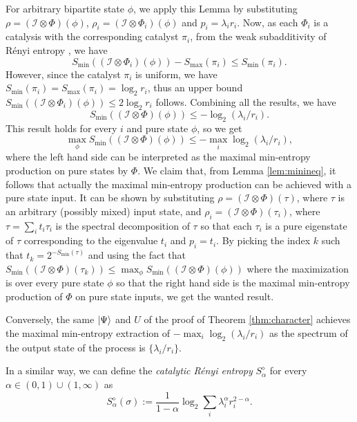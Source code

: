 \documentclass[aps, reprint, amsmath,amssymb, prx, superscriptaddress]{revtex4-2}
\begin{document}
\begin{proofEnd}
    For arbitrary bipartite state $\phi$, we apply this Lemma by substituting $\rho=(\mathcal{I}\otimes \Phi)(\phi)$, $\rho_i=(\mathcal{I}\otimes \Phi_i)(\phi)$ and $p_i = \lambda_i r_i$. Now, as each $\Phi_i$ is a catalysis with the corresponding catalyst $\pi_i$, from the weak subadditivity of R\'{e}nyi entropy \cite{van2002renyi}, we have
    $$S_{\min{}}((\mathcal{I}\otimes \Phi_i)(\phi))-S_{\max{}}(\pi_i)\leq S_{\min{}}(\pi_i).$$
    However, since the catalyst $\pi_i$ is uniform, we have $S_{\min{}}(\pi_i)=S_{\max{}}(\pi_i)=\log_2  r_i$, thus an upper bound $S_{\min{}}((\mathcal{I}\otimes \Phi_i)(\phi)) \leq 2 \log_2  r_i$ follows. Combining all the results, we have
    $$S_{\min{}}((\mathcal{I}\otimes \Phi)(\phi)) \leq  - \log_2  (\lambda_i/r_i).$$
    This result holds for every $i$ and pure state $\phi$, so we get
    \begin{equation}
        \max_\phi S_{\min{}}((\mathcal{I}\otimes \Phi)(\phi)) \leq  - \max_i \log_2  (\lambda_i/r_i),
    \end{equation}
    where the left hand side can be interpreted as the maximal min-entropy production on pure states by $\Phi$. We claim that, from Lemma \ref{lem:minineq}, it follows that actually the maximal min-entropy production can be achieved with a pure state input. It can be shown by substituting $\rho=(\mathcal{I}\otimes\Phi)(\tau)$, where $\tau$ is an arbitrary (possibly mixed) input state, and $\rho_i=(\mathcal{I}\otimes\Phi)(\tau_i)$, where $\tau=\sum_i t_i \tau_i$ is the spectral decomposition of $\tau$ so that each $\tau_i$ is a pure eigenstate of $\tau$ corresponding to the eigenvalue $t_i$ and $p_i=t_i$. By picking the index $k$ such that $t_k=2^{-S_{\min{}}(\tau)}$ and using the fact that $S_{\min{}}((\mathcal{I}\otimes\Phi)(\tau_k))\leq \max_\phi S_{\min{}}((\mathcal{I}\otimes\Phi)(\phi)) $ where the maximization is over every pure state $\phi$ so that the right hand side is the maximal min-entropy production of $\Phi$ on pure state inputs, we get the wanted result.
    
    Conversely, the same $\ket{\Psi}$ and $U$ of the proof of Theorem \ref{thm:character} achieves the maximal min-entropy extraction of $-\max_i \log_2  (\lambda_i/r_i)$ as the spectrum of the output state of the process is $\{\lambda_i/r_i\}$.
\end{proofEnd}
In a similar way, we can define the \textit{catalytic R\'{e}nyi entropy} $S_\alpha^\diamond$ for every $\alpha \in (0,1)\cup(1,\infty)$ as
\begin{equation} 
    S_\alpha^\diamond(\sigma):=\frac{1}{1-\alpha}\log_2 \sum_i \lambda_i^\alpha r_i^{2-\alpha}.
\end{equation}
\end{document}
